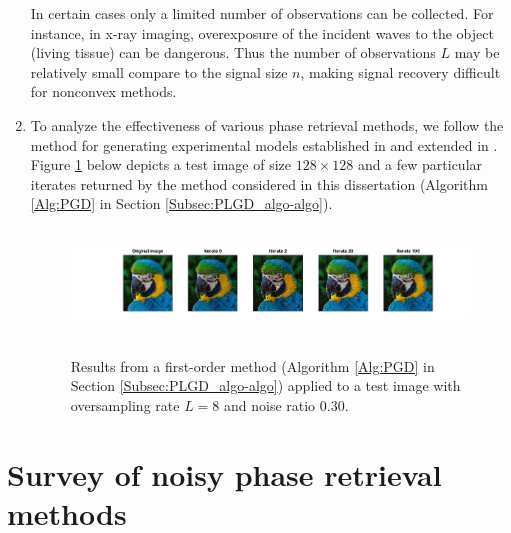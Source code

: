 \begin{enumerate}
In certain cases only a limited number of observations can be collected.  For instance, in x-ray imaging, overexposure of the incident waves to the object (living tissue) can be dangerous.  Thus the number of observations $L$ may be relatively small compare to the signal size $n$, making signal recovery difficult for nonconvex methods.



\item
To analyze the effectiveness of various phase retrieval methods, we follow the method for generating experimental models established in \cite{DBLP:journals/tit/CandesLS15} and extended in \cite{DBLP:journals/siamsc/FriedlanderM16}.  Figure \ref{Fig:parrot_signal_iterates} below depicts a test image of size $128 \times 128$ and a few particular iterates returned by the method considered in this dissertation (Algorithm \ref{Alg:PGD} in Section \ref{Subsec:PLGD_algo-algo}).  

\begin{figure}[H]
\centering
\hbox{\hspace{-2.3cm} \includegraphics[scale=0.55]{parrot_signal_iterates} }
\caption{Results from a first-order method (Algorithm \ref{Alg:PGD} in Section \ref{Subsec:PLGD_algo-algo}) applied to a test image with oversampling rate $L=8$ and noise ratio $0.30$.}
\label{Fig:parrot_signal_iterates}
\end{figure}


\end{enumerate}



\section{Survey of noisy phase retrieval methods}  	\label{Subsec:phase_retrieval-survey_of_methods}

